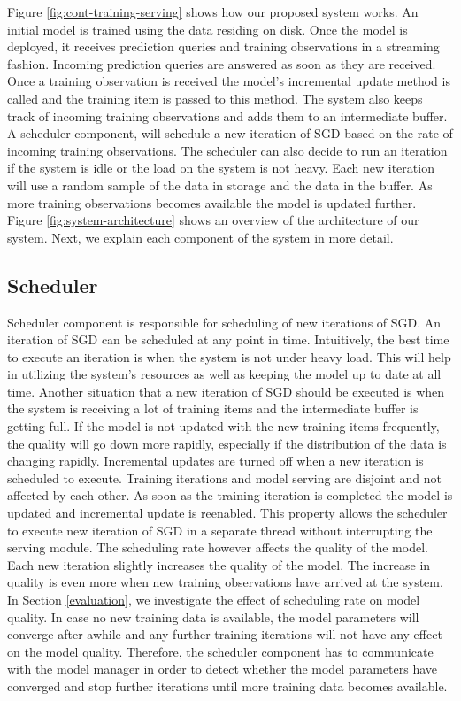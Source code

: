 \documentclass{sig-alternate-05-2015}
\begin{document}
Figure \ref{fig:cont-training-serving} shows how our proposed system works.
An initial model is trained using the data residing on disk.
Once the model is deployed, it receives prediction queries and training observations in a streaming fashion.
Incoming prediction queries are answered as soon as they are received.
Once a training observation is received the model's incremental update method is called and the training item is passed to this method.
The system also keeps track of incoming training observations and adds them to an intermediate buffer.
A scheduler component, will schedule a new iteration of SGD based on the rate of incoming training observations. 
The scheduler can also decide to run an iteration if the system is idle or the load on the system is not heavy. 
Each new iteration will use a random sample of the data in storage and the data in the buffer. 
As more training observations becomes available the model is updated further.
Figure \ref{fig:system-architecture} shows an overview of the architecture of our system.
Next, we explain each component of the system in more detail.

\subsection{Scheduler}\label{scheduler}
Scheduler component is responsible for scheduling of new iterations of SGD.
An iteration of SGD can be scheduled at any point in time.
Intuitively, the best time to execute an iteration is when the system is not under heavy load.
This will help in utilizing the system's resources as well as keeping the model up to date at all time.
Another situation that a new iteration of SGD should be executed is when the system is receiving a lot of training items and the intermediate buffer is getting full.
If the model is not updated with the new training items frequently, the quality will go down more rapidly, especially if the distribution of the data is changing rapidly.
Incremental updates are turned off when a new iteration is scheduled to execute.
Training iterations and model serving are disjoint and not affected by each other.
As soon as the training iteration is completed the model is updated and incremental update is reenabled.
This property allows the scheduler to execute new iteration of SGD in a separate thread without interrupting the serving module.
The scheduling rate however affects the quality of the model.
Each new iteration slightly increases the quality of the model.
The increase in quality is even more when new training observations have arrived at the system.
In Section \ref{evaluation}, we investigate the effect of scheduling rate on model quality.
In case no new training data is available, the model parameters will converge after awhile and any further training iterations will not have any effect on the model quality.
Therefore, the scheduler component has to communicate with the model manager in order to detect whether the model parameters have converged and stop further iterations until more training data becomes available.
\end{document}
